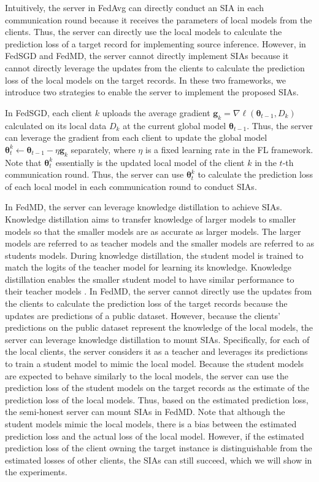 \documentclass[10pt,journal,compsoc]{IEEEtran}
\begin{document}
Intuitively, the server in FedAvg can directly conduct an SIA in each communication round because it receives the parameters of local models from the clients. Thus, the server can directly use the local models to calculate the prediction loss of a target record for implementing source inference. However, in FedSGD and FedMD, the server cannot directly implement SIAs because it cannot directly leverage the updates from the clients to calculate the prediction loss of the local models on the target records. In these two frameworks, we introduce two strategies to enable the server to implement the proposed SIAs.

In FedSGD, each client $k$ uploads the average gradient ${\bm{g}_k} = \nabla {\ell }({\bm{\theta} _{t-1}},D_k)$ calculated on its local data $D_k$ at the current global model $\bm{\theta}_{t-1}$. Thus, the server can leverage the gradient from each client to update the global model $\bm{\theta} _{t}^k \leftarrow {\bm{\theta} _{t-1}} - \eta {\bm{g}_k}$ separately, where $\eta$ is a fixed learning rate in the FL framework. Note that $\bm{\theta} _{t}^k$ essentially is the updated local model of the client $k$ in the $t$-th communication round. Thus, the server can use $\bm{\theta} _{t}^k$ to calculate the prediction loss of each local model in each communication round to conduct SIAs. 

{In FedMD, the server can leverage knowledge distillation \cite{ba2014deep,hinton2015distilling} to achieve SIAs. Knowledge distillation aims to transfer knowledge of larger models to smaller models so that the smaller models are as accurate as larger models. The larger models are referred to as teacher models and the smaller models are referred to as students models. During knowledge distillation, the student model is trained to match the logits of the teacher model for learning its knowledge. Knowledge distillation enables the smaller student model to have similar performance to their teacher models \cite{crowley2018moonshine}. In FedMD, the server cannot directly use the updates from the clients to calculate the prediction loss of the target records because the updates are predictions of a public dataset. However, because the clients' predictions on the public dataset represent the knowledge of the local models, the server can leverage knowledge distillation to mount SIAs. Specifically, for each of the local clients, the server considers it as a teacher and leverages its predictions to train a student model to mimic the local model. Because the student models are expected to behave similarly to the local models, the server can use the prediction loss of the student models on the target records as the estimate of the prediction loss of the local models. Thus, based on the estimated prediction loss, the semi-honest server can mount SIAs in FedMD. Note that although the student models mimic the local models, there is a bias between the estimated prediction loss and the actual loss of the local model. However, if the estimated prediction loss of the client owning the target instance is distinguishable from the estimated losses of other clients, the SIAs can still succeed, which we will show in the experiments.}
\end{document}
